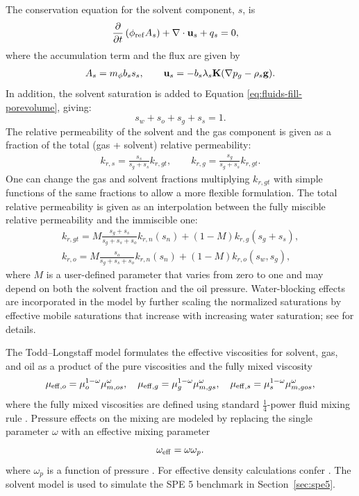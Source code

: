 The conservation equation for the solvent component, $s$, is 
\begin{align}\label{eq:materialbalance-cont-solvent}
\frac{\partial}{\partial t} \left(\phi_{\rm ref} A_s \right)
 + \nabla \cdot {\bf u}_s + q_s & = 0,
\end{align}
where the accumulation term and the flux are given by
\begin{gather}  
  A_s = m_{\phi} b_{s} s_{s}, \qquad       
  {\bf u}_s = - b_{s} \lambda_s {\bf K} (\nabla p_g - \rho_s {\bf g}). 
\end{gather}
In addition, the solvent saturation is added to Equation \eqref{eq:fluids-fill-porevolume}, giving: 
\begin{equation}
s_w + s_o + s_g + s_s = 1.
\label{eq:fluids-fill-porevolume-solvent} 
\end{equation}
The relative permeability of the solvent and the gas component is given as a fraction of the total (gas + solvent) relative permeability:
\begin{gather}
 k_{r,s} = \frac{s_s}{s_g + s_s} k_{r,gt}, \qquad
 k_{r,g} = \frac{s_g}{s_g + s_s} k_{r,gt}.
\end{gather}
One can change the gas and solvent fractions multiplying $k_{r,gt}$ with simple functions of the same fractions to allow a more flexible formulation. The total relative permeability is given as an interpolation between the fully miscible relative permeability and the immiscible one: 
\begin{gather}
 k_{r,gt} = M \frac{s_g + s_s}{s_g + s_s + s_o} k_{r,n}(s_n) +(1 - M) k_{r,g}(s_g + s_s), \\
 k_{r,o} = M \frac{s_o}{s_g + s_s + s_o} k_{r,n}(s_n) +(1 - M) k_{r,o}(s_w, s_g),
\end{gather}
where $M$ is a user-defined parameter that varies from zero to one and may depend on both the solvent fraction and the oil pressure. Water-blocking effects are incorporated in the model by further scaling the normalized saturations by effective mobile saturations that increase with increasing water saturation;  see \cite{chase1984numerical} for details. 

The Todd--Longstaff model formulates the effective viscosities for solvent, gas, and oil as a product of the pure viscosities and the fully mixed viscosity
\begin{gather}
 \mu_{{\rm eff},o} = \mu_{o}^{1 - \omega} \mu_{m,os}^{\omega}, \quad
 \mu_{{\rm eff},g} = \mu_{g}^{1 - \omega} \mu_{m,gs}^{\omega}, \quad
 \mu_{{\rm eff},s} = \mu_{s}^{1 - \omega} \mu_{m,gos}^{\omega},
\end{gather}
where the fully mixed viscosities are defined using standard $\tfrac{1}{4}$-power fluid mixing rule \citep{todd1972development}. Pressure effects on the mixing are modeled by replacing the single parameter $\omega$ with an effective mixing parameter 
\begin{equation}
 \omega_{\rm eff} = \omega \omega_p.
\end{equation}
where $\omega_p$ is a function of pressure \citep{chase1984numerical, jakupsstovu2001upscaling}. 
For effective density calculations confer \cite{chase1984numerical}.  The solvent model is used to simulate the SPE 5 benchmark in Section~\ref{sec:spe5}{\revised .}


